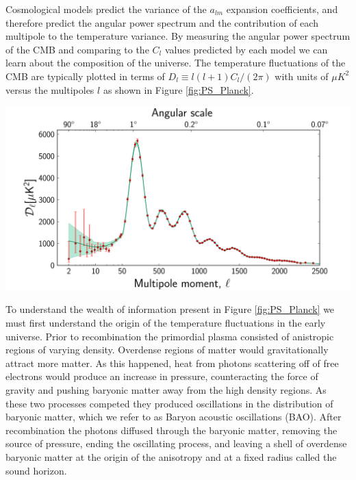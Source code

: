 \documentclass[a4paper,12pt]{article}
\begin{document}
Cosmological models predict the variance of the $a_{lm}$ expansion coefficients, and therefore predict the angular power spectrum and the contribution of each multipole to the temperature variance.  By measuring the angular power spectrum of the CMB and comparing to the $C_l$ values predicted by each model we can learn about the composition of the universe.  The temperature fluctuations of the CMB are typically plotted in terms of $D_l \equiv l(l+1)C_l/(2\pi)$ with units of $\mu K^2$ versus the multipoles $l$ as shown in Figure \ref{fig:PS_Planck}.

\begin{center} 
\includegraphics[scale=0.4]{PS_Planck.png}
\label{fig:PS_Planck}
\end{center} 


To understand the wealth of information present in Figure \ref{fig:PS_Planck} we must first understand the origin of the temperature fluctuations in the early universe.  Prior to recombination the primordial plasma consisted of anistropic regions of varying density. Overdense regions of matter would gravitationally attract more matter.  As this happened, heat from photons scattering off of free electrons would produce an increase in pressure, counteracting the force of gravity and pushing baryonic matter away from the high density regions.  As these two processes competed they produced oscillations in the distribution of baryonic matter, which we refer to as Baryon acoustic oscillations (BAO).  After recombination the photons diffused through the baryonic matter, removing the source of pressure, ending the oscillating process, and leaving a shell of overdense baryonic matter at the origin of the anisotropy and at a fixed radius called the sound horizon.
\end{document}
